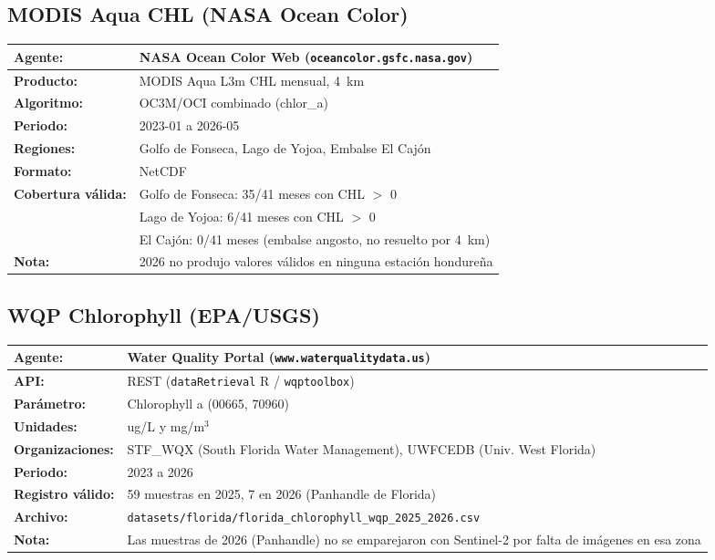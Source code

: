 \documentclass[12pt]{article}
\newlength{\descrwidth}
\begin{document}
\subsection{MODIS Aqua CHL (NASA Ocean Color)}
\begin{tabular}{P{\descrwidth} P{\dimexpr\textwidth-\tabcolsep\relax}}
\toprule
\textbf{Agente:} & NASA Ocean Color Web (\texttt{oceancolor.gsfc.nasa.gov}) \\
\midrule
\textbf{Producto:} & MODIS Aqua L3m CHL mensual, 4~km \\
\midrule
\textbf{Algoritmo:} & OC3M/OCI combinado (chlor\_a) \\
\midrule
\textbf{Periodo:} & 2023-01 a 2026-05 \\
\midrule
\textbf{Regiones:} & Golfo de Fonseca, Lago de Yojoa, Embalse El Caj\'on \\
\midrule
\textbf{Formato:} & NetCDF \\
\midrule
\textbf{Cobertura v\'alida:} & Golfo de Fonseca: 35/41 meses con CHL $>$ 0 \\
& Lago de Yojoa: 6/41 meses con CHL $>$ 0 \\
& El Caj\'on: 0/41 meses (embalse angosto, no resuelto por 4~km) \\
\midrule
\textbf{Nota:} & 2026 no produjo valores v\'alidos en ninguna estaci\'on hondure\~na \\
\bottomrule
\end{tabular}

\subsection{WQP Chlorophyll (EPA/USGS)}
\begin{tabular}{P{\descrwidth} P{\dimexpr\textwidth-\tabcolsep\relax}}
\toprule
\textbf{Agente:} & Water Quality Portal (\texttt{www.waterqualitydata.us}) \\
\midrule
\textbf{API:} & REST (\texttt{dataRetrieval} R / \texttt{wqptoolbox}) \\
\midrule
\textbf{Par\'ametro:} & Chlorophyll a (00665, 70960) \\
\midrule
\textbf{Unidades:} & ug/L y mg/m$^3$ \\
\midrule
\textbf{Organizaciones:} & STF\_WQX (South Florida Water Management), UWFCEDB (Univ. West Florida) \\
\midrule
\textbf{Periodo:} & 2023 a 2026 \\
\midrule
\textbf{Registro v\'alido:} & 59 muestras en 2025, 7 en 2026 (Panhandle de Florida) \\
\midrule
\textbf{Archivo:} & \texttt{datasets/florida/\-florida\_chlorophyll\-\_wqp\_2025\_2026.csv} \\
\midrule
\textbf{Nota:} & Las muestras de 2026 (Panhandle) no se emparejaron con Sentinel-2 por falta de im\'agenes en esa zona \\
\bottomrule
\end{tabular}
\end{document}

